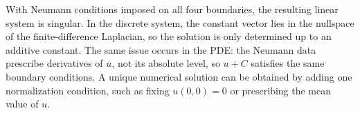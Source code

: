 \documentclass[11pt]{article}
\begin{document}
\vspace{0.4cm}
\noindent
With Neumann conditions imposed on all four boundaries, the resulting linear system is singular. 
In the discrete system, the constant vector lies in the nullspace of the finite-difference Laplacian, 
so the solution is only determined up to an additive constant. The same issue occurs in the PDE: 
the Neumann data prescribe derivatives of \(u\), not its absolute level, so \(u+C\) satisfies the 
same boundary conditions. A unique numerical solution can be obtained by adding one normalization 
condition, such as fixing \(u(0,0)=0\) or prescribing the mean value of \(u\).
\end{document}
